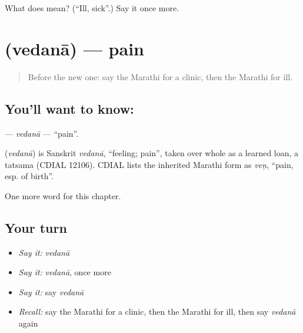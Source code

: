 \begin{tcolorbox}[breakable,colback=teal!4,colframe=teal!35!black,title={Before you move on}]
What does  mean? (\textquotedblleft{}Ill, sick\textquotedblright{}.) Say it once more.
\end{tcolorbox}
\section[\texorpdfstring{\mr{वेदना} (vedanā)}{वेदना (vedanā)}]{ (vedanā) — pain}

\label{lesson:MR-C73-vedana}



\begin{quote}
Before the new one: say the Marathi for a clinic, then the Marathi for ill.
\end{quote}

\subsection*{You'll want to know: }
\textbf{} — \emph{vedanā} — \textquotedblleft{}pain\textquotedblright{}.

\begin{cousinweb}
\textbf{} (\emph{vedanā}) is Sanskrit \emph{vedanā}, \textquotedblleft{}feeling; pain\textquotedblright{}, taken over whole as a learned loan, a tatsama (CDIAL 12106). CDIAL lists the inherited Marathi form as \emph{veṇ}, \textquotedblleft{}pain, esp. of birth\textquotedblright{}.
\end{cousinweb}

\begin{grammarlens}[title={What you've built}]
One more word for this chapter.
\end{grammarlens}

\subsection*{Your turn}
\begin{itemize}
\raggedright
  \item \emph{Say it:} \emph{vedanā}
  \item \emph{Say it:} \emph{vedanā}, once more
  \item \emph{Say it:} say \emph{vedanā}
  \item \emph{Recall:} say the Marathi for a clinic, then the Marathi for ill, then say \emph{vedanā} again
\end{itemize}

